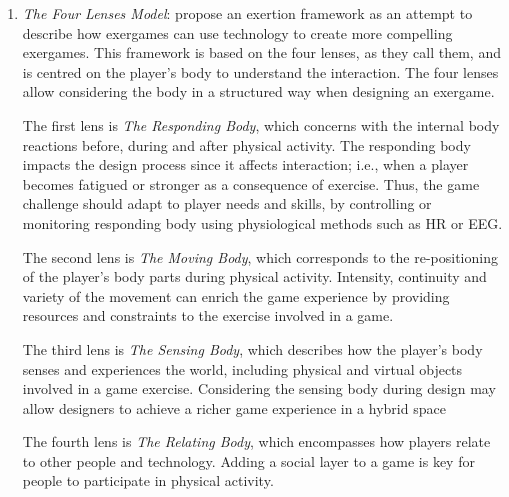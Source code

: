\begin{enumerate}
    \item \emph{The Four Lenses Model}: \textcite{Mueller2011} propose an exertion framework as an attempt to describe how exergames can use technology to create more compelling exergames. This framework is based on the four lenses, as they call them, and is centred on the player's body to understand the interaction. The four lenses allow considering the body in a structured way when designing an exergame.
    
    The first lens is \emph{The Responding Body}, which concerns with the internal body reactions before, during and after physical activity. The responding body impacts the design process since it affects interaction; i.e., when a player becomes fatigued or stronger as a consequence of exercise. Thus, the game challenge should adapt to player needs and skills, by controlling or monitoring responding body using physiological methods such as \ac{HR} or \ac{EEG}.
    
    The second lens is \emph{The Moving Body}, which corresponds to the re-positioning of the player's body parts during physical activity. Intensity, continuity and variety of the movement can enrich the game experience by providing resources and constraints to the exercise involved in a game.
    
    The third lens is \emph{The Sensing Body}, which describes how the player's body senses and experiences the world, including physical and virtual objects involved in a game exercise. Considering the sensing body during design may allow designers to achieve a richer game experience in a hybrid space
    
    The fourth lens is \emph{The Relating Body}, which encompasses how players relate to other people and technology. Adding a social layer to a game is key for people to participate in physical activity.
    

\end{enumerate}
